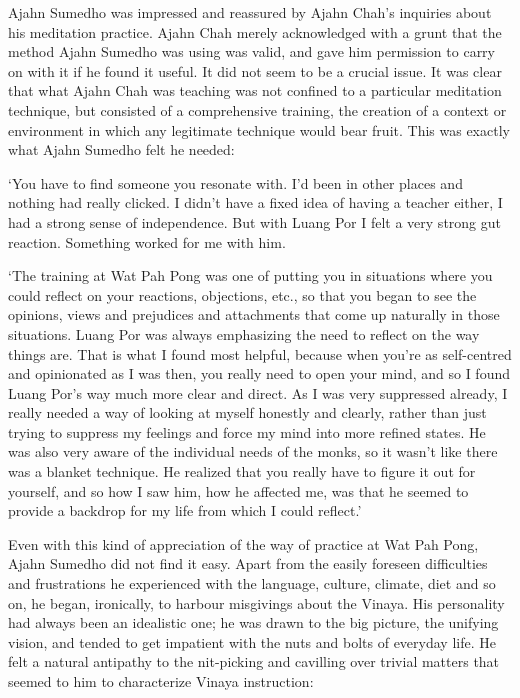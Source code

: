 Ajahn Sumedho was impressed and reassured by Ajahn Chah's inquiries
about his meditation practice. Ajahn Chah merely acknowledged with a
grunt that the method Ajahn Sumedho was using was valid, and gave him
permission to carry on with it if he found it useful. It did not seem to
be a crucial issue. It was clear that what Ajahn Chah was teaching was
not confined to a particular meditation technique, but consisted of a
comprehensive training, the creation of a context or environment in
which any legitimate technique would bear fruit. This was exactly what
Ajahn Sumedho felt he needed: 

`You have to find someone you resonate with. I'd been in other places
and nothing had really clicked. I didn't have a fixed idea of having a
teacher either, I had a strong sense of independence. But with Luang Por
I felt a very strong gut reaction. Something worked for me with him. 

`The training at Wat Pah Pong was one of putting you in situations where
you could reflect on your reactions, objections, etc., so that you began
to see the opinions, views and prejudices and attachments that come up
naturally in those situations. Luang Por was always emphasizing the need
to reflect on the way things are. That is what I found most helpful, 
because when you're as self-centred and opinionated as I was then, you
really need to open your mind, and so I found Luang Por's way much more
clear and direct. As I was very suppressed already, I really needed a
way of looking at myself honestly and clearly, rather than just trying
to suppress my feelings and force my mind into more refined states. He
was also very aware of the individual needs of the monks, so it wasn't
like there was a blanket technique. He realized that you really have to
figure it out for yourself, and so how I saw him, how he affected me, 
was that he seemed to provide a backdrop for my life from which I could
reflect.'

Even with this kind of appreciation of the way of practice at Wat Pah
Pong, Ajahn Sumedho did not find it easy. Apart from the easily foreseen
difficulties and frustrations he experienced with the language, culture, 
climate, diet and so on, he began, ironically, to harbour misgivings
about the Vinaya. His personality had always been an idealistic one; he
was drawn to the big picture, the unifying vision, and tended to get
impatient with the nuts and bolts of everyday life. He felt a natural
antipathy to the nit-picking and cavilling over trivial matters that
seemed to him to characterize Vinaya instruction: 

